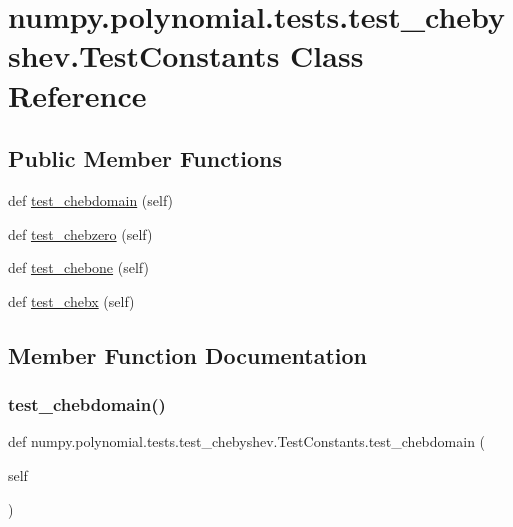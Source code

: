 \hypertarget{classnumpy_1_1polynomial_1_1tests_1_1test__chebyshev_1_1TestConstants}{}\section{numpy.\+polynomial.\+tests.\+test\+\_\+chebyshev.\+Test\+Constants Class Reference}
\label{classnumpy_1_1polynomial_1_1tests_1_1test__chebyshev_1_1TestConstants}
\subsection*{Public Member Functions}
\begin{DoxyCompactItemize}
\item 
def \hyperlink{classnumpy_1_1polynomial_1_1tests_1_1test__chebyshev_1_1TestConstants_a13574f1ede102002354c1dbf0cb547dd}{test\+\_\+chebdomain} (self)
\item 
def \hyperlink{classnumpy_1_1polynomial_1_1tests_1_1test__chebyshev_1_1TestConstants_ad7ef63289785ed1994999c6408ecf83c}{test\+\_\+chebzero} (self)
\item 
def \hyperlink{classnumpy_1_1polynomial_1_1tests_1_1test__chebyshev_1_1TestConstants_aa93b5482a344f091abb21f8a31aee6bf}{test\+\_\+chebone} (self)
\item 
def \hyperlink{classnumpy_1_1polynomial_1_1tests_1_1test__chebyshev_1_1TestConstants_a91c466a0a9216cbfceb93c383aa67e88}{test\+\_\+chebx} (self)
\end{DoxyCompactItemize}


\subsection{Member Function Documentation}
\mbox{\label{classnumpy_1_1polynomial_1_1tests_1_1test__chebyshev_1_1TestConstants_a13574f1ede102002354c1dbf0cb547dd}} 
\subsubsection{\texorpdfstring{test\+\_\+chebdomain()}{test\_chebdomain()}}
{\footnotesize\ttfamily def numpy.\+polynomial.\+tests.\+test\+\_\+chebyshev.\+Test\+Constants.\+test\+\_\+chebdomain (\begin{DoxyParamCaption}\item[{}]{self }\end{DoxyParamCaption})}

